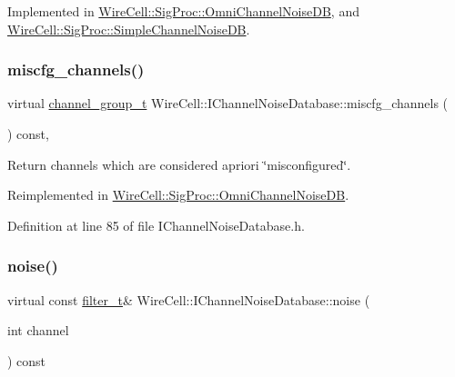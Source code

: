 Implemented in \hyperlink{class_wire_cell_1_1_sig_proc_1_1_omni_channel_noise_d_b_a37f1dda111792a36315f977c2ade5783}{Wire\+Cell\+::\+Sig\+Proc\+::\+Omni\+Channel\+Noise\+DB}, and \hyperlink{class_wire_cell_1_1_sig_proc_1_1_simple_channel_noise_d_b_a8e8aa023834a47f96b0bdb69bc76e7a8}{Wire\+Cell\+::\+Sig\+Proc\+::\+Simple\+Channel\+Noise\+DB}.

\mbox{\label{class_wire_cell_1_1_i_channel_noise_database_ad653c3c17b0524eca95fa4ce8574ffe9}} 
\subsubsection{\texorpdfstring{miscfg\+\_\+channels()}{miscfg\_channels()}}
{\footnotesize\ttfamily virtual \hyperlink{class_wire_cell_1_1_i_channel_noise_database_a7fedd6ab67ba4e7eeb8cf182cc9dc6b1}{channel\+\_\+group\+\_\+t} Wire\+Cell\+::\+I\+Channel\+Noise\+Database\+::miscfg\+\_\+channels (\begin{DoxyParamCaption}{ }\end{DoxyParamCaption}) const\hspace{0.3cm}{\ttfamily [inline]}, {\ttfamily [virtual]}}



Return channels which are considered a\textquotesingle{}priori \char`\"{}misconfigured\char`\"{}. 



Reimplemented in \hyperlink{class_wire_cell_1_1_sig_proc_1_1_omni_channel_noise_d_b_a32b0db5811fe2d33ec566c31283800fa}{Wire\+Cell\+::\+Sig\+Proc\+::\+Omni\+Channel\+Noise\+DB}.



Definition at line 85 of file I\+Channel\+Noise\+Database.\+h.

\mbox{\label{class_wire_cell_1_1_i_channel_noise_database_a1197551d9dcfd6dc8f656a8aecd5b962}} 
\subsubsection{\texorpdfstring{noise()}{noise()}}
{\footnotesize\ttfamily virtual const \hyperlink{class_wire_cell_1_1_i_channel_noise_database_a0acbae29743542eb1c652f7a56e692f5}{filter\+\_\+t}\& Wire\+Cell\+::\+I\+Channel\+Noise\+Database\+::noise (\begin{DoxyParamCaption}\item[{int}]{channel }\end{DoxyParamCaption}) const\hspace{0.3cm}{\ttfamily [pure virtual]}}




